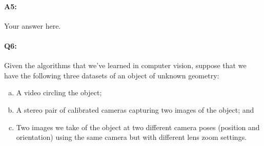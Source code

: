 \paragraph{A5:} Your answer here.






\pagebreak
\paragraph{Q6:}
Given the algorithms that we've learned in computer vision, suppose that we have the following three datasets of an object of unknown geometry:

\begin{enumerate}[(a)]
\item A video circling the object;
\item A stereo pair of calibrated cameras capturing two images of the object; and
\item Two images we take of the object at two different camera poses (position and orientation) using the same camera but with different lens zoom settings.
\end{enumerate}

